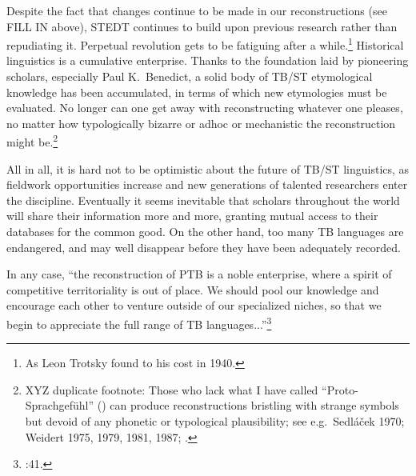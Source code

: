 Despite the fact that changes continue to be made in our reconstructions (see FILL IN above), STEDT continues to build upon previous research rather than repudiating it. 
Perpetual revolution gets to be fatiguing after a while.\footnote{As Leon Trotsky found to his cost in 1940.} Historical linguistics is a cumulative enterprise. Thanks to the foundation laid by pioneering scholars, especially Paul K.\ Benedict, a solid body of TB/ST etymological knowledge has been accumulated, in terms of which new etymologies must be evaluated. No longer can one get away with reconstructing whatever one pleases, no matter how typologically bizarre or adhoc or mechanistic the reconstruction might be.\footnote{XYZ duplicate footnote: Those who lack what I have called “Proto-Sprachgef\"uhl” (\citealt{JAM-PLPS}) can produce reconstructions bristling with strange symbols but devoid of any phonetic or typological plausibility; see e.g.\ Sedl\'a\v{c}ek 1970; Weidert 1975, 1979, 1981, 1987; \citealt{PS-STL}.}

All in all, it is hard not to be optimistic about the future of TB/ST linguistics, as fieldwork opportunities increase and new generations of talented researchers enter the discipline. Eventually it seems inevitable that scholars throughout the world will share their information more and more, granting mutual access to their databases for the common good. On the other hand, too many TB languages are endangered, and may well disappear before they have been adequately recorded.

In any case, “the reconstruction of PTB is a noble enterprise, where a spirit of competitive territoriality is out of place. We should pool our knowledge and encourage each other to venture outside of our specialized niches, so that we begin to appreciate the full range of TB languages...”\footnote{\citealt{JAM-PLPS}:41.}





